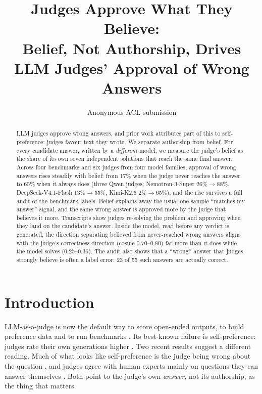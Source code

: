 \documentclass[11pt]{article}
\title{Judges Approve What They Believe:\\Belief, Not Authorship, Drives LLM Judges' Approval of Wrong Answers}
\author{Anonymous ACL submission}
\begin{document}
\maketitle

\begin{abstract}
LLM judges approve wrong answers, and prior work attributes part of this to self-preference: judges favour text
they wrote. We separate authorship from belief. For every candidate answer, written by a \emph{different} model,
we measure the judge's belief as the share of its own seven independent solutions that reach the same final
answer. Across four benchmarks and six judges from four model families, approval of wrong answers rises steadily
with belief: from 17\% when the judge never reaches the answer to 65\% when it always does (three Qwen judges;
Nemotron-3-Super 26\%$\rightarrow$88\%, DeepSeek-V4.1-Flash 13\%$\rightarrow$55\%, Kimi-K2.6 2\%$\rightarrow$65\%),
and the rise survives a full audit of the benchmark labels. Belief explains away the usual one-sample ``matches my answer'' signal, and the same
wrong answer is approved more by the judge that believes it more. Transcripts show judges re-solving the problem and
approving when they land on the candidate's answer. Inside the model, read before any verdict is generated, the
direction separating believed from never-reached wrong answers aligns with the judge's correctness direction
(cosine 0.70--0.80) far more than it does while the model solves (0.25--0.36). The audit also shows that a
``wrong'' answer that judges strongly believe is often a label error: 23 of 55 such answers are actually correct.
\end{abstract}

\section{Introduction}

LLM-as-a-judge is now the default way to score open-ended outputs, to build preference data and to run
benchmarks \citep{zheng2023judging}. Its best-known failure is self-preference: judges rate their own generations
higher \citep{panickssery2024llm}. Two recent results suggest a different reading. Much of what looks like
self-preference is the judge being wrong about the question \citep{roytburg2026narcissists}, and judges agree with
human experts mainly on questions they can answer themselves \citep{krumdick2026nofreelabels}. Both point to the
judge's own \emph{answer}, not its authorship, as the thing that matters.
\end{document}

